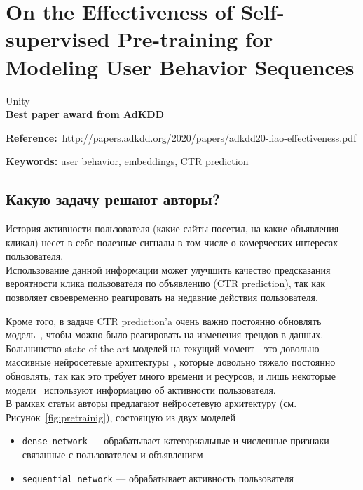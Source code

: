 \chapter{On the Effectiveness of Self-supervised Pre-training for Modeling User Behavior Sequences}

Unity \\

\textbf{Best paper award from AdKDD}

\textbf{Reference:}~\url{http://papers.adkdd.org/2020/papers/adkdd20-liao-effectiveness.pdf}

\textbf{Keywords:} user behavior, embeddings, CTR prediction

\section*{Какую задачу решают авторы?}

История активности пользователя (какие сайты посетил, на какие объявления кликал) несет в себе полезные сигналы в том числе о комерческих интересах пользователя. \\

Использование данной информации может улучшить качество предсказания вероятности клика пользователя по объявлению (CTR prediction), так как позволяет своевременно реагировать на недавние действия пользователя.

Кроме того, в задаче CTR prediction'a очень важно постоянно обновлять модель~\cite{he2014practical}, чтобы можно было реагировать на изменения трендов в данных. \\

Большинство state-of-the-art моделей на текущий момент - это довольно массивные нейросетевые архитектуры~\cite{guo2017deepfm,zhou2018deep,wang2017deep}, которые довольно тяжело постоянно обновлять, так как это требует много времени и ресурсов, и лишь некоторые модели~\cite{zhou2018deep} используют информацию об активности пользователя. \\

В рамках статьи авторы предлагают нейросетевую архитектуру (см. Рисунок~\ref{fig:pretrainig}), состоящую из двух моделей 
\begin{itemize}
    \item \texttt{dense network} --- обрабатывает категориальные и численные признаки связанные с пользователем и объявлением
    \item \texttt{sequential network} --- обрабатывает активность пользователя
\end{itemize}

